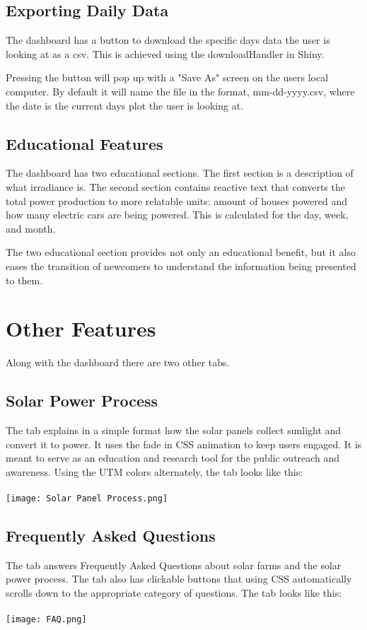 \documentclass{sigchi}
\begin{document}
\subsection{Exporting Daily Data}
The dashboard has a button to download the specific days data the user is looking at as a csv. This is achieved using the downloadHandler in Shiny.\cite{10_R-Shiny} 

Pressing the button will pop up with a "Save As" screen on the users local computer. By default it will name the file in the format, mm-dd-yyyy.csv, where the date is the current days plot the user is looking at.

\subsection{Educational Features}
The dashboard has two educational sections. The first section is a description of what irradiance is. The second section contains reactive text that converts the total power production to more relatable units: amount of houses powered and how many electric cars are being powered. This is calculated for the day, week, and month. 

The two educational section provides not only an educational benefit, but it also eases the transition of newcomers to understand the information being presented to them.
\section{Other Features}
Along with the dashboard there are two other tabs.
\subsection{Solar Power Process}
The tab explains in a simple format how the solar panels collect sunlight and convert it to power. It uses the fade in CSS animation to keep users engaged. It is meant to serve as an education and research tool for the public outreach and awareness. Using the UTM colors alternately, the tab looks like this:\\\\
\texttt{[image: Solar Panel Process.png]}
\subsection{Frequently Asked Questions}
The tab answers Frequently Asked Questions about solar farms and the solar power process. The tab also has clickable buttons that using CSS automatically scrolls down to the appropriate category of questions. The tab looks like this:\\\\
\texttt{[image: FAQ.png]}
\end{document}
